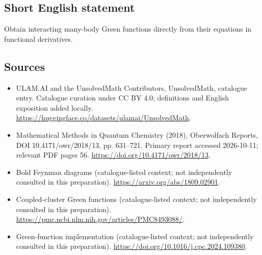 \documentclass[11pt]{article}
\begin{document}
\subsection{Short English statement}
Obtain interacting many-body Green functions directly from their equations in functional derivatives.
\subsection{Sources}
\begin{itemize}
\item[\hypertarget{source:statement:1}{S1}] ULAM.AI and the UnsolvedMath Contributors, UnsolvedMath, catalogue entry. Catalogue curation under CC BY 4.0; definitions and English exposition added locally.
\url{https://huggingface.co/datasets/ulamai/UnsolvedMath}.
\item[\hypertarget{source:statement:2}{S2}] Mathematical Methods in Quantum Chemistry (2018), Oberwolfach Reports, DOI 10.4171/owr/2018/13, pp. 631--721. Primary report accessed 2026-10-11; relevant PDF pages 56.
\url{https://doi.org/10.4171/owr/2018/13}.
\item[\hypertarget{source:statement:3}{S3}] Bold Feynman diagrams (catalogue-listed context; not independently consulted in this preparation).
\url{https://arxiv.org/abs/1809.02901}.
\item[\hypertarget{source:statement:4}{S4}] Coupled-cluster Green functions (catalogue-listed context; not independently consulted in this preparation).
\url{https://pmc.ncbi.nlm.nih.gov/articles/PMC8493088/}.
\item[\hypertarget{source:statement:5}{S5}] Green-function implementation (catalogue-listed context; not independently consulted in this preparation).
\url{https://doi.org/10.1016/j.cpc.2024.109380}.
\end{itemize}
\label{end:statement}
\end{document}
